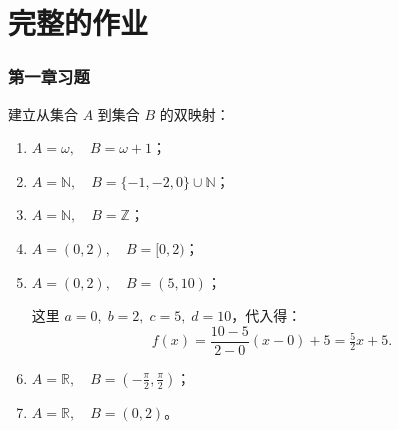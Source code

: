 \chapter{完整的作业}
\subsection*{第一章习题}


\begin{homework}[1.1]
建立从集合 $A$ 到集合 $B$ 的双映射：
\begin{enumerate}
  \item $A = \omega, \quad B = \omega + 1$；
  \item $A = \mathbb{N}, \quad B = \{-1,-2,0\} \cup \mathbb{N}$；
  \item $A = \mathbb{N}, \quad B = \mathbb{Z}$；
  \item $A = (0,2), \quad B = [0,2)$；
  \item $A = (0,2), \quad B = (5,10)$；
  
  \begin{dxtips}[当函数做一个定义域一个值域]
      这里 $a=0, \; b=2, \; c=5, \; d=10$，代入得：
\[
f(x) = \frac{10-5}{2-0}(x-0) + 5 = \tfrac{5}{2}x + 5.
\]
  \end{dxtips}
  \item $A = \mathbb{R}, \quad B = \left(-\tfrac{\pi}{2}, \tfrac{\pi}{2}\right)$；
  \item $A = \mathbb{R}, \quad B = (0,2)$。
\end{enumerate}
\end{homework}
